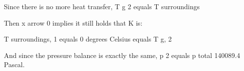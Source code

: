 Since there is no more heat transfer, T g 2 equals T surroundings

Then x arrow 0 implies it still holds that K is:

T surroundings, 1 equals 0 degrees Celsius equals T g, 2

And since the pressure balance is exactly the same, p 2 equals p total 140089.4 Pascal.